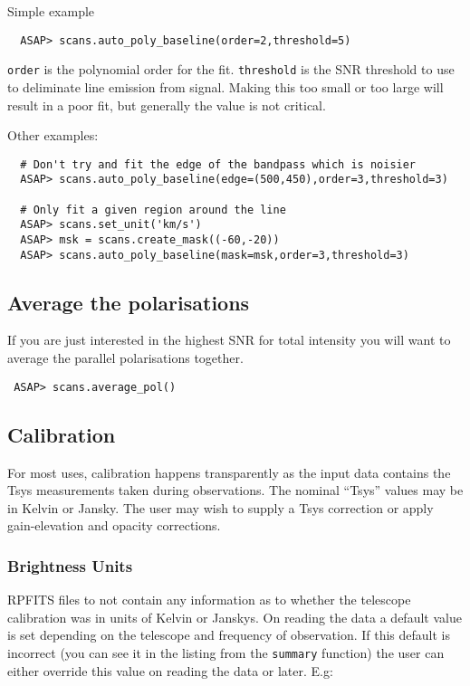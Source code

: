 \documentclass[11pt]{article}
\newcommand{\cmd}[1]{{\tt #1}}
\begin{document}
Simple example

\begin{verbatim}
  ASAP> scans.auto_poly_baseline(order=2,threshold=5)
\end{verbatim}

\cmd{order} is the polynomial order for the fit. \cmd{threshold} is
the SNR threshold to use to deliminate line emission from
signal. Making this too small or too large will result in a poor fit,
but generally the value is not critical.

Other examples:

\begin{verbatim}
  # Don't try and fit the edge of the bandpass which is noisier
  ASAP> scans.auto_poly_baseline(edge=(500,450),order=3,threshold=3)

  # Only fit a given region around the line
  ASAP> scans.set_unit('km/s')
  ASAP> msk = scans.create_mask((-60,-20))
  ASAP> scans.auto_poly_baseline(mask=msk,order=3,threshold=3)

\end{verbatim}

\subsection{Average the polarisations}

If you are just interested in the highest SNR for total intensity you
will want to average the parallel polarisations together.

\begin{verbatim}
 ASAP> scans.average_pol()
\end{verbatim}

\subsection{Calibration}

For most uses, calibration happens transparently as the input data
contains the Tsys measurements taken during observations. The nominal
``Tsys'' values may be in Kelvin or Jansky. The user may wish to
supply a Tsys correction or apply gain-elevation and opacity
corrections.

\subsubsection{Brightness Units}

RPFITS files to not contain any information as to whether the telescope
calibration was in units of Kelvin or Janskys.  On reading the data a
default value is set depending on the telescope and frequency of
observation.  If this default is incorrect (you can see it in the
listing from the \cmd{summary} function) the user can either override
this value on reading the data or later.  E.g:
\end{document}
